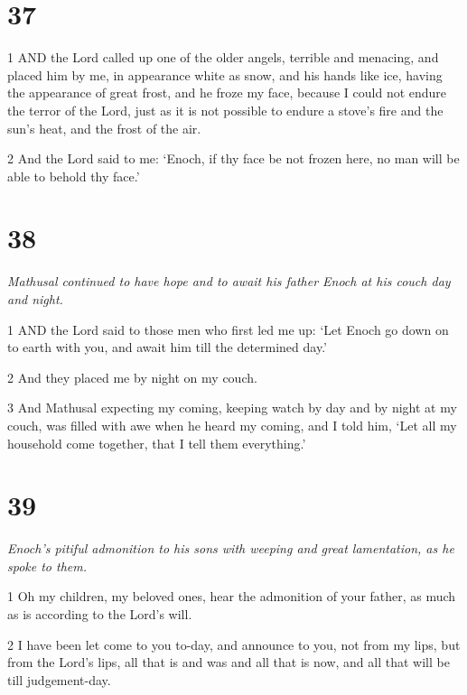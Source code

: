\chapter{37}

\par 1 AND the Lord called up one of the older angels, terrible and menacing, and placed him by me, in appearance white as snow, and his hands like ice, having the appearance of great frost, and he froze my face, because I could not endure the terror of the Lord, just as it is not possible to endure a stove's fire and the sun's heat, and the frost of the air.

\par 2 And the Lord said to me: ‘Enoch, if thy face be not frozen here, no man will be able to behold thy face.’

\chapter{38}

\par \textit{Mathusal continued to have hope and to await his father Enoch at his couch day and night.}

\par 1 AND the Lord said to those men who first led me up: ‘Let Enoch go down on to earth with you, and await him till the determined day.’

\par 2 And they placed me by night on my couch.

\par 3 And Mathusal expecting my coming, keeping watch by day and by night at my couch, was filled with awe when he heard my coming, and I told him, ‘Let all my household come together, that I tell them everything.’

\chapter{39}

\par \textit{Enoch's pitiful admonition to his sons with weeping and great lamentation, as he spoke to them.}

\par 1 Oh my children, my beloved ones, hear the admonition of your father, as much as is according to the Lord's will.

\par 2 I have been let come to you to-day, and announce to you, not from my lips, but from the Lord's lips, all that is and was and all that is now, and all that will be till judgement-day.

